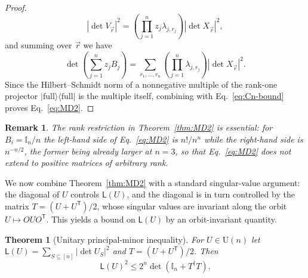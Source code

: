 \documentclass[prx,twocolumn,superscriptaddress,aps,10pt, frontmatterverbose, reprint,footinbib,longbibliography=true]{revtex4-2}
\newtheorem{theorem}{Theorem}
\newtheorem{remark}{Remark}
\newcommand{\trans}{\mathsf{T}}
\begin{document}
\begin{proof}
\begin{equation}
    |\det V_{\vec r}|^2
=
\left(\prod_{j=1}^n z_j\lambda_{j,r_j}\right)
|\det X_{\vec r}|^2,
\end{equation}
and summing over $\vec{r}$ we have
\begin{equation}
    [z_1\cdots z_n]\det\!\left(\sum_{j=1}^n z_jB_j\right)
=
\sum_{r_1,\ldots,r_n}
\left(\prod_{j=1}^n\lambda_{j,r_j}\right)
|\det X_{\vec r}|^2.
\end{equation}
Since the Hilbert--Schmidt norm of a nonnegative multiple of the rank-one projector $|\mathrm{full}\rangle\langle\mathrm{full}|$ is the multiple itself, combining with Eq.~\eqref{eq:Cn-bound} proves Eq.~\eqref{eq:MD2}. \end{proof}

\begin{remark}
The rank restriction in Theorem~\ref{thm:MD2} is essential: for $B_i=\mathbb{I}_n/n$ the left-hand side of Eq.~\eqref{eq:MD2} is $n!/n^n$ while the right-hand side is $n^{-n/2}$, the former being already larger at $n=3$, so that Eq.~\eqref{eq:MD2} does not extend to positive matrices of arbitrary rank.\end{remark}

We now combine Theorem~\ref{thm:MD2} with a standard singular-value argument: the diagonal of $U$ controls $\mathsf{L}(U)$, and the diagonal is in turn controlled by the matrix $T=(U+U^{\trans})/2$, whose singular values are invariant along the orbit $U\mapsto OUO^{\trans}$. This yields a bound on $\mathsf{L}(U)$ by an orbit-invariant quantity.

\begin{theorem}[Unitary principal-minor inequality]
\label{thm:UL}
For $U\in \mathrm{U}(n)$ let $\mathsf{L}(U)=\sum_{S\subseteq[n]}|\det U_S|^2$ and $T=(U+U^{\trans})/2$. Then
\begin{equation}
    \mathsf{L}(U)^2\le 2^n\det\!\left(\mathbb{I}_n+T^\dagger T\right).
    \label{eq:UL}
\end{equation}
\end{theorem}
\end{document}
